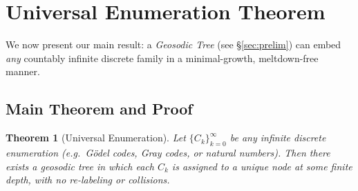 \documentclass[11pt]{article}
\newtheorem{theorem}{Theorem}
\theoremstyle{definition}
\theoremstyle{remark}
\begin{document}
      \section{Universal Enumeration Theorem}
\label{sec:enumeration}

We now present our main result: a \emph{Geosodic Tree} (see \S\ref{sec:prelim})
can embed \emph{any} countably infinite discrete family in a minimal-growth, meltdown-free manner.

\subsection{Main Theorem and Proof}

\begin{theorem}[Universal Enumeration]
\label{thm:univenum}
Let $\{C_k\}_{k=0}^\infty$ be any infinite discrete enumeration (e.g.\ G\"odel codes, Gray codes, 
or natural numbers). Then there exists a geosodic tree in which each $C_k$ is assigned to a unique node 
at some finite depth, with no re-labeling or collisions.
\end{theorem}
\end{document}
